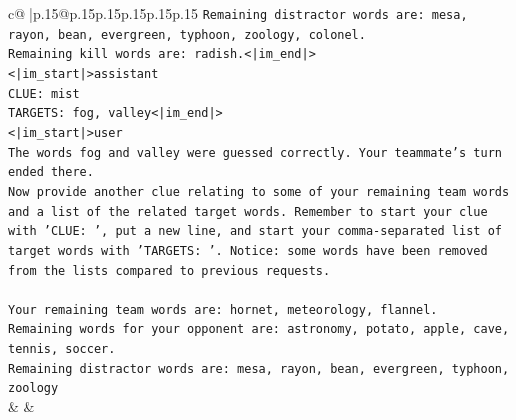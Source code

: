 \documentclass{article}
\begin{document}
{\begin{supertabular}{c@{$\;$}|p{.15\linewidth}@{}p{.15\linewidth}p{.15\linewidth}p{.15\linewidth}p{.15\linewidth}p{.15\linewidth}}
{{{\texttt{Remaining distractor words are: mesa, rayon, bean, evergreen, typhoon, zoology, colonel.} \\
\texttt{Remaining kill words are: radish.<|im\_end|>} \\
\texttt{<|im\_start|>assistant} \\
\texttt{CLUE: mist} \\
\texttt{TARGETS: fog, valley<|im\_end|>} \\
\texttt{<|im\_start|>user} \\
\texttt{The words fog and valley were guessed correctly. Your teammate's turn ended there.} \\
\texttt{Now provide another clue relating to some of your remaining team words and a list of the related target words. Remember to start your clue with 'CLUE: ', put a new line, and start your comma{-}separated list of target words with 'TARGETS: '. Notice: some words have been removed from the lists compared to previous requests.} \\
\\ 
\texttt{Your remaining team words are: hornet, meteorology, flannel.} \\
\texttt{Remaining words for your opponent are: astronomy, potato, apple, cave, tennis, soccer.} \\
\texttt{Remaining distractor words are: mesa, rayon, bean, evergreen, typhoon, zoology} \\
            }
        }
    }
    & & \\ \\


\end{supertabular}}
\end{document}
